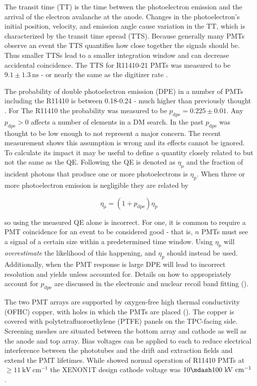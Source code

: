 The transit time (TT) is the time between the photoelectron emission and the arrival of the electron avalanche at the anode.  Changes in
the photoelectron's initial position, velocity, and emission angle cause variation in the TT, which is characterized by the
transit time spread (TTS).  Because generally many PMTs observe an event the TTS quantifies how close together the signals should
be.  Thus
smaller TTSs lead to a smaller integration window and can decrease accidental coincidence.  The TTS for R11410-21 PMTs was measured to be
$9.1 \pm 1.3\ \mathrm{ns}$ - or nearly the same as the digitizer rate .

The probability of double photoelectron emission (DPE) in a number of PMTs including the R11410 is between 0.18-0.24 - much higher
than previously thought .  For The R11410 the probability was measured to be
$p_{\mathrm{dpe}} = 0.225 \pm 0.01$.  Any $p_{\mathrm{dpe}} > 0$ affects a number of elements in a DM
search.  In the past $p_{\mathrm{dpe}}$ was thought to be low enough to not represent a major concern.  The recent measurement shows this
assumption is wrong and its effects cannot be ignored.  To calculate its impact it may be useful to define a quantity closely
related to but not the same as the QE.  Following  the QE is denoted as $\eta_{\mathrm{\mu}}$ and the fraction of
incident photons that produce one or more photoelectrons is $\eta_{\mathrm{p}}$.  When three or more photoelectron emission is negligible
they are related by

\begin{equation}
\eta_{\mathrm{\mu}} = (1 + p_{\mathrm{dpe}}) \eta_{\mathrm{p}}
\label{eq:xenon1t_pmts_dpe}
\end{equation}

\noindent so using the measured QE alone is incorrect.  For one, it is common to require a PMT coincidence for an event to
be considered good - that is, $n$ PMTs must see a signal of a certain size within a predetermined time window.  Using
$\eta_{\mathrm{\mu}}$ will
\textit{overestimate} the likelihood of this happening, and $\eta_{\mathrm{p}}$ should instead be used.  Additionally, when the PMT
response is large DPE will lead to incorrect resolution and yields unless accounted for.  Details on how to appropriately
account for $p_{\mathrm{dpe}}$ are discussed in the electronic and nuclear recoil band fitting
().

The two PMT arrays are supported by oxygen-free high thermal conductivity (OFHC) copper, with holes in which the PMTs are placed
().  The
copper is covered with polytetrafluoroethylene (PTFE) panels on the TPC-facing side.  Screening meshes are situated between the bottom
array and cathode as well as the anode and top array.  Bias voltages can be applied to each to reduce electrical interference between the
phototubes and the drift and extraction fields and extend the PMT lifetimes.  While  showed normal operation of R11410
PMTs at $\geq 11\ \mathrm{kV\ cm^{-1}}$ the XENON1T design cathode voltage was $10 \mdash 100\ \mathrm{kV\ cm^{-1}}$.

